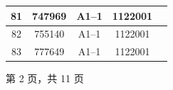 \documentclass[UTF8,10pt,a4paper,fontset=fandol]{ctexart}
\newcommand{\fieldvalue}[1]{#1}
\begin{document}
\begin{center}
\begin{tabular}{|c|c|c|c|c|}
\fieldvalue{81} &
\fieldvalue{747969} &
\fieldvalue{A1--1} &
\fieldvalue{1122001} & \\ \hline

\fieldvalue{82} &
\fieldvalue{755140} &
\fieldvalue{A1--1} &
\fieldvalue{1122001} & \\ \hline

\fieldvalue{83} &
\fieldvalue{777649} &
\fieldvalue{A1--1} &
\fieldvalue{1122001} & \\ \hline
\end{tabular}

\vspace{1em}

第 2 页，共 11 页
\end{center}

\newpage
\end{document}
